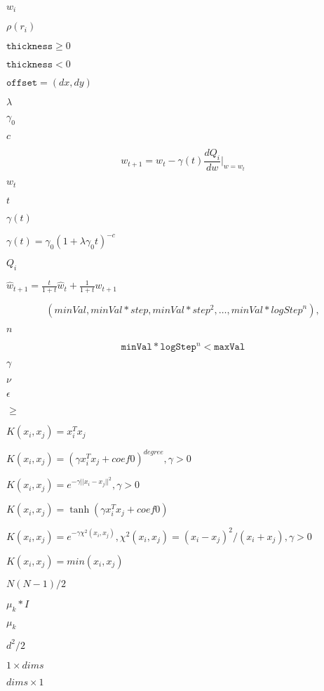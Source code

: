 \documentclass{article}
\begin{document}
$w_i$
\pagebreak

$\rho(r_i)$
\pagebreak

$\texttt{thickness} \ge 0$
\pagebreak

$\texttt{thickness}<0$
\pagebreak

$\texttt{offset}=(dx,dy)$
\pagebreak

$\lambda$
\pagebreak

$\gamma_0$
\pagebreak

$c$
\pagebreak

\[w_{t+1} = w_t - \gamma(t) \frac{dQ_i}{dw} |_{w = w_t}\]
\pagebreak

$w_t$
\pagebreak

$t$
\pagebreak

$\gamma(t)$
\pagebreak

$\gamma(t) = \gamma_0 (1 + \lambda \gamma_0 t) ^ {-c}$
\pagebreak

$Q_i$
\pagebreak

$\widehat{w}_{t+1} = \frac{t}{1+t}\widehat{w}_{t} + \frac{1}{1+t}w_{t+1}$
\pagebreak

\[(minVal, minVal*step, minVal*{step}^2, \dots, minVal*{logStep}^n),\]
\pagebreak

$n$
\pagebreak

\[\texttt{minVal} * \texttt{logStep} ^n < \texttt{maxVal}\]
\pagebreak

$\gamma$
\pagebreak

$\nu$
\pagebreak

$\epsilon$
\pagebreak

$\geq$
\pagebreak

$K(x_i, x_j) = x_i^T x_j$
\pagebreak

$K(x_i, x_j) = (\gamma x_i^T x_j + coef0)^{degree}, \gamma > 0$
\pagebreak

$K(x_i, x_j) = e^{-\gamma ||x_i - x_j||^2}, \gamma > 0$
\pagebreak

$K(x_i, x_j) = \tanh(\gamma x_i^T x_j + coef0)$
\pagebreak

$K(x_i, x_j) = e^{-\gamma \chi^2(x_i,x_j)}, \chi^2(x_i,x_j) = (x_i-x_j)^2/(x_i+x_j), \gamma > 0$
\pagebreak

$K(x_i, x_j) = min(x_i,x_j)$
\pagebreak

$N(N-1)/2$
\pagebreak

$\mu_k * I$
\pagebreak

$\mu_k$
\pagebreak

$d^2/2$
\pagebreak

$1 \times dims$
\pagebreak

$dims \times 1$
\pagebreak
\end{document}
